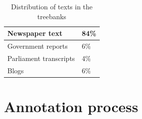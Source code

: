 \documentclass[11pt,a4paper]{article}
\begin{document}
\begin{table}[!h]
  \centering
  \begin{tabular}{|l|l|}
    \hline
    Newspaper text & 84\% \\
    \hline
   Government reports & 6\% \\
    \hline
   Parliament transcripts & 4\% \\
    \hline
   Blogs & 6\% \\
    \hline
  \end{tabular}
  \caption{Distribution of texts in the treebanks}
  \label{tb:distribution}
\end{table}




%



\section{Annotation process}
\end{document}
